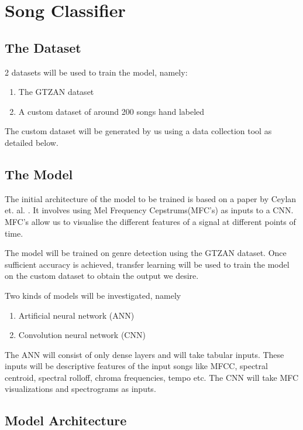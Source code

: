 \section{Song Classifier}

\subsection{The Dataset}
2 datasets will be used to train the model, namely:
\begin{enumerate}
	\item The GTZAN dataset
	\item A custom dataset of around 200 songs hand labeled 
\end{enumerate}
The custom dataset will be generated by us using a data collection tool as detailed below.

\subsection{The Model}
The initial architecture of the model to be trained is based on a paper by Ceylan et. al. \cite{ceylan_automatic_2021}. It involves using Mel Frequency Cepstrums(MFC’s) as inputs to a CNN. MFC’s allow us to visualise the different features of a signal at different points of time. \newline

The model will be trained on genre detection using the GTZAN dataset. Once sufficient accuracy is achieved, transfer learning will be used to train the model on the custom dataset to obtain the output we desire. \newline


Two kinds of models will be investigated, namely

\begin{enumerate}
	\item Artificial neural network (ANN)
	\item Convolution neural network (CNN)
\end{enumerate}
The ANN will consist of only dense layers and will take tabular inputs. These inputs will be descriptive features of the input songs like MFCC, spectral centroid, spectral rolloff, chroma frequencies, tempo etc. The CNN will take MFC visualizations and spectrograms as inputs.

\subsection{Model Architecture}

